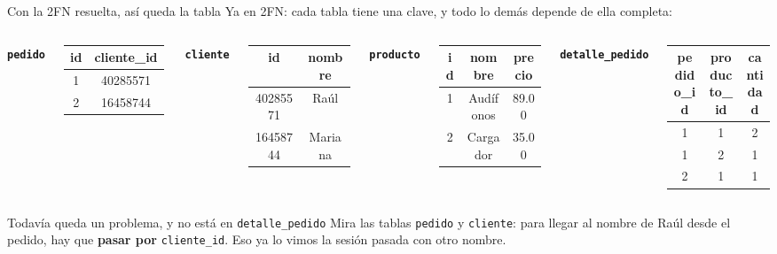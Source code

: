 \documentclass[aspectratio=169,10pt,c]{beamer}
\newcommand{\tbl}[1]{\textcolor{utpNaranja}{\texttt{#1}}}
\newcommand{\tblb}[1]{\textcolor{utpNaranja}{\textbf{\texttt{#1}}}}
\begin{document}
\begin{frame}{Con la 2FN resuelta, así queda la tabla}
\small Ya en 2FN: cada tabla tiene una clave, y todo lo demás depende de ella completa:
\vspace{0.2cm}
\begin{columns}[T,onlytextwidth]
\footnotesize\centering\tblb{pedido}\\[2pt]
\begin{tabular}{cc}
\toprule
\bfseries id & \bfseries cliente\_id \\
\midrule
1 & 40285571 \\
2 & 16458744 \\
\bottomrule
\end{tabular}
\vspace{4pt}

\footnotesize\centering\tblb{cliente}\\[2pt]
\begin{tabular}{cc}
\toprule
\bfseries id & \bfseries nombre \\
\midrule
40285571 & Raúl \\
16458744 & Mariana \\
\bottomrule
\end{tabular}
\footnotesize\centering\tblb{producto}\\[2pt]
\begin{tabular}{ccc}
\toprule
\bfseries id & \bfseries nombre & \bfseries precio \\
\midrule
1 & Audífonos & 89.00 \\
2 & Cargador & 35.00 \\
\bottomrule
\end{tabular}
\footnotesize\centering\tblb{detalle\_pedido}\\[2pt]
\begin{tabular}{ccc}
\toprule
\bfseries pedido\_id & \bfseries producto\_id & \bfseries cantidad \\
\midrule
1 & 1 & 2 \\
1 & 2 & 1 \\
2 & 1 & 1 \\
\bottomrule
\end{tabular}
\end{columns}
\vspace{0.35cm}
\begin{alertblock}{Todavía queda un problema, y no está en \tbl{detalle\_pedido}}
\small Mira las tablas \tbl{pedido} y \tbl{cliente}: para llegar al nombre de Raúl desde el pedido, hay que \textbf{pasar por} \texttt{cliente\_id}. Eso ya lo vimos la sesión pasada con otro nombre.
\end{alertblock}
\end{frame}
\end{document}
